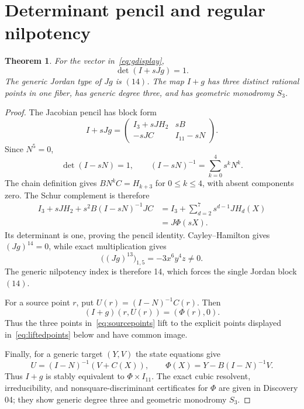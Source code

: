 \documentclass[11pt]{article}
\newtheorem{theorem}{Theorem}
\begin{document}
\section{Determinant pencil and regular nilpotency}

\begin{theorem}\label{thm:main}
For the vector in~\eqref{eq:gdisplay},
\[
 \det(I+sJg)=1.
\]
The generic Jordan type of $Jg$ is $(14)$.  The map $I+g$ has three
distinct rational points in one fiber, has generic degree three, and has
geometric monodromy $S_3$.
\end{theorem}

\begin{proof}
The Jacobian pencil has block form
\[
 I+sJg=
 \begin{pmatrix}
 I_3+sJH_2&sB\\
 -sJC&I_{11}-sN
 \end{pmatrix}.
\]
Since $N^5=0$,
\[
 \det(I-sN)=1,\qquad
 (I-sN)^{-1}=\sum_{k=0}^4s^kN^k.
\]
The chain definition gives $BN^kC=H_{k+3}$ for $0\leq k\leq4$, with
absent components zero.  The Schur complement is therefore
\[
\begin{aligned}
I_3+sJH_2+s^2B(I-sN)^{-1}JC
 &=I_3+\sum_{d=2}^7s^{d-1}JH_d(X)\\
 &=J\Phi(sX).
\end{aligned}
\]
Its determinant is one, proving the pencil identity.  Cayley--Hamilton gives
$(Jg)^{14}=0$, while exact multiplication gives
\begin{equation}
 \bigl((Jg)^{13}\bigr)_{1,5}=-3x^6y^4z\ne0. \label{eq:index}
\end{equation}
The generic nilpotency index is therefore 14, which forces the single Jordan
block $(14)$.

For a source point $r$, put $U(r)=(I-N)^{-1}C(r)$.  Then
\[
 (I+g)(r,U(r))=(\Phi(r),0).
\]
Thus the three points in~\eqref{eq:sourcepoints} lift to the explicit points
displayed in~\eqref{eq:liftedpoints} below and have common image.

Finally, for a generic target $(Y,V)$ the state equations give
\[
 U=(I-N)^{-1}(V+C(X)),\qquad
 \Phi(X)=Y-B(I-N)^{-1}V.
\]
Thus $I+g$ is stably equivalent to $\Phi\times I_{11}$.  The exact cubic
resolvent, irreducibility, and nonsquare-discriminant certificates for
$\Phi$ are given in Discovery 04; they show generic degree three and
geometric monodromy $S_3$.
\end{proof}
\end{document}
